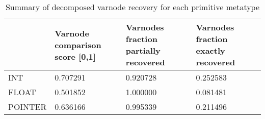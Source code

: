 \begin{table}[t]
\centering
\caption{Summary of decomposed varnode recovery for each primitive metatype}
\label{table:metatype-recovery-summary-decomposed}
\begin{tabular}{lp{6.0cm}p{6.0cm}p{6.0cm}}
\toprule
{} &  Varnode comparison score [0,1] &  Varnodes fraction partially recovered &  Varnodes fraction exactly recovered \\
\midrule
INT     &                        0.707291 &                               0.920728 &                             0.252583 \\
FLOAT   &                        0.501852 &                               1.000000 &                             0.081481 \\
POINTER &                        0.636166 &                               0.995339 &                             0.211496 \\
\bottomrule
\end{tabular}
\end{table}
